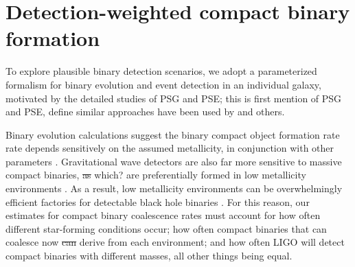 \documentclass[nofootinbib,twocolumn,prd]{emulateapj}
\newcommand\jillianremark[1]{{\color{blue}#1}}
\newcommand\abbrvPSgrb{PSG}
\newcommand\abbrvPSellipticals{PSE}
\begin{document}
\section{Detection-weighted compact binary formation}
\label{sec:model}


To explore plausible binary detection scenarios, we adopt a parameterized formalism for binary evolution and event
detection in an individual galaxy, motivated by
the detailed studies of  \abbrvPSgrb{} and \abbrvPSellipticals; \jillianremark{this is first mention of PSG and PSE, define} similar approaches have been used by
\cite{2016arXiv160508783L} and others.


Binary evolution calculations suggest the binary compact object formation rate rate depends sensitively on the assumed metallicity, in conjunction
with other parameters \citep[see,\,e.g.][and references
  therein]{popsyn-LowMetallicityImpact-Chris2008,popsyn-LIGO-SFR-2008,gwastro-EventPopsynPaper-2016}.
Gravitational wave detectors are also far more sensitive to  massive compact binaries, \sout{as}  \jillianremark{ which?} are  preferentially  formed in low metallicity
environments \citep{PSellipticals,popsyn-LowMetallicityImpact2c-StarTrackRevised-2014}.  As a result, low metallicity
environments can be overwhelmingly efficient factories for detectable black hole binaries
\citep{popsyn-LowMetallicityImpact2c-StarTrackRevised-2014,gwastro-EventPopsynPaper-2016}.  
%
For this reason, our estimates for compact binary coalescence rates must account for how often  different star-forming
conditions occur;  how often compact binaries that can coalesce now \jillianremark{\sout{can}}  derive from each environment; and how often LIGO will detect compact
binaries with different masses, all other things being equal.
\end{document}
